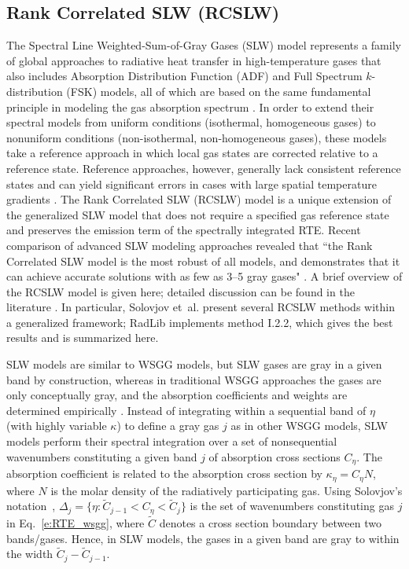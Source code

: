 \documentclass[preprint,12pt]{elsarticle}
\begin{document}
\subsection{Rank Correlated SLW (RCSLW)} \label{s:RCSLW}

The Spectral Line Weighted-Sum-of-Gray Gases (SLW) model represents a family of global approaches to radiative heat transfer in high-temperature gases that also includes Absorption Distribution Function (ADF) and Full Spectrum $k$-distribution (FSK) models, all of which are based on the same fundamental principle in modeling the gas absorption spectrum \cite{Solovjov_2016}. In order to extend their spectral models from uniform conditions (isothermal, homogeneous gases) to nonuniform conditions (non-isothermal, non-homogeneous gases), these models take a reference approach in which local gas states are corrected relative to a reference state. Reference approaches, however, generally lack consistent reference states and can yield significant errors in cases with large spatial temperature gradients \cite{Solovjov_2017}. The Rank Correlated SLW (RCSLW) model is a unique extension of the generalized SLW model that does not require a specified gas reference state and preserves the emission term of the spectrally integrated RTE. 
%
Recent comparison of advanced SLW modeling approaches revealed that ``the Rank Correlated SLW model is the most robust of all models, and demonstrates that it can achieve accurate solutions with as few as 3–5 gray gases" \citep{Badger_2019}. A brief overview of the RCSLW model is given here; detailed discussion can be found in the literature \cite{Solovjov_2000, Solovjov_2001, Solovjov_2008, Solovjov_2011, Solovjov_2014, Solovjov_2016, Solovjov_2017, Webb_2018}. 
In particular, Solovjov et~al. \cite{Solovjov_2017} present several RCSLW methods within a generalized framework; RadLib implements method I.2.2, which gives the best results and is summarized here.
%

SLW models are similar to WSGG models, but SLW gases are gray in a given band by construction, whereas in traditional WSGG approaches the gases are only conceptually gray, and the absorption coefficients and weights are determined empirically \cite{Badger_2019}. 
%
Instead of integrating within a sequential band of $\eta$ (with highly variable $\kappa$) to define a gray gas $j$ as in other WSGG models, SLW models perform their spectral integration over a set of nonsequential wavenumbers constituting a given band $j$ of absorption cross sections $C_\eta$.
%
The absorption coefficient is related to the absorption cross section by $\kappa_\eta=C_\eta N$, where $N$ is the molar density of the radiatively participating gas.
%
Using Solovjov's notation~\cite{Solovjov_2017}, $\Delta_j=\{\eta:\tilde{C}_{j-1}<C_\eta<\tilde{C}_j\}$ is the set of wavenumbers constituting gas $j$ in Eq.~\ref{e:RTE_wsgg}, where $\tilde{C}$ denotes a cross section boundary between two bands/gases.
%
Hence, in SLW models, the gases in a given band are gray to within the width $\tilde{C}_j-\tilde{C}_{j-1}$.
\end{document}
